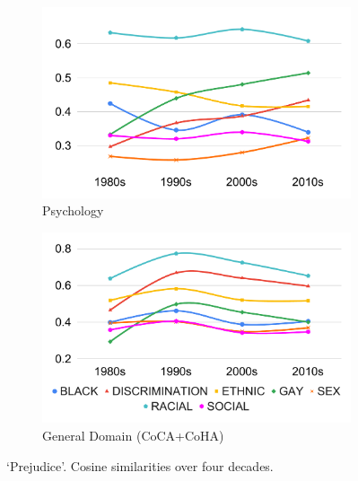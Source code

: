 \documentclass[output=paper]{langsci/langscibook}
\begin{document}
\begin{figure}
  \begin{subfigure}[b]{.5\linewidth}
        \includegraphics[width=.95\textwidth]{figures/VYLOMOVA_prejudice-psych.pdf}
        \caption{Psychology}
        \end{subfigure}\begin{subfigure}[b]{.5\linewidth}
        \includegraphics[width=\textwidth]{figures/VYLOMOVA_prejudice-coca.pdf}
        \caption{General Domain (CoCA+CoHA)}
        \end{subfigure}
 \caption{`Prejudice'. Cosine similarities over four decades.\label{fig:w2v-cos-sim-prejudice}}
\end{figure}
\end{document}
